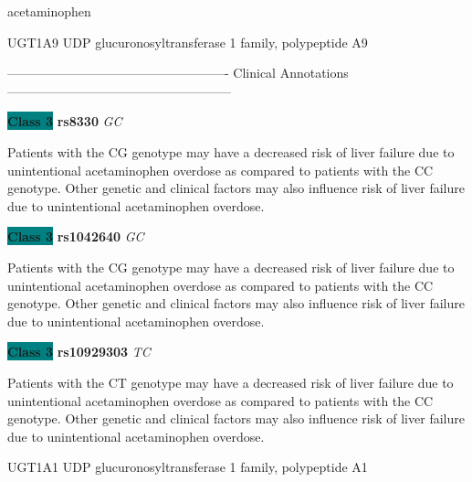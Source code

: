 \documentclass{resume} %
\begin{document}
\begin{rSection}{ acetaminophen }
\begin{rSubsection}{ UGT1A9 }{ UDP glucuronosyltransferase 1 family, polypeptide A9 }{}{}
\item[] ---------------------------------------------------- Clinical Annotations -----------------------------------------------------\newline
\item \textbf{\colorbox{teal} {Class 3}} \textbf{ rs8330 } \textit{ GC }
\item[] Patients with the CG genotype may have a decreased risk of liver failure due to unintentional acetaminophen overdose as compared to patients with the CC genotype. Other genetic and clinical factors may also influence risk of liver failure due to unintentional acetaminophen overdose.\item \textbf{\colorbox{teal} {Class 3}} \textbf{ rs1042640 } \textit{ GC }
\item[] Patients with the CG genotype may have a decreased risk of liver failure due to unintentional acetaminophen overdose as compared to patients with the CC genotype. Other genetic and clinical factors may also influence risk of liver failure due to unintentional acetaminophen overdose.\item \textbf{\colorbox{teal} {Class 3}} \textbf{ rs10929303 } \textit{ TC }
\item[] Patients with the CT genotype may have a decreased risk of liver failure due to unintentional acetaminophen overdose as compared to patients with the CC genotype. Other genetic and clinical factors may also influence risk of liver failure due to unintentional acetaminophen overdose.
\end{rSubsection}\begin{rSubsection}{ UGT1A1 }{ UDP glucuronosyltransferase 1 family, polypeptide A1 }{}{}
\item[]


\end{rSubsection}
\end{rSection}
\end{document}
